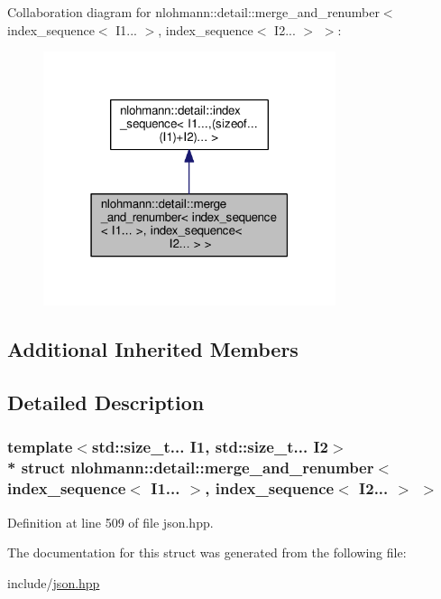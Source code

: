 Collaboration diagram for nlohmann\+:\+:detail\+:\+:merge\+\_\+and\+\_\+renumber$<$ index\+\_\+sequence$<$ I1... $>$, index\+\_\+sequence$<$ I2... $>$ $>$\+:\nopagebreak
\begin{figure}[H]
\begin{center}
\leavevmode
\includegraphics[width=243pt]{structnlohmann_1_1detail_1_1merge__and__renumber_3_01index__sequence_3_01_i1_8_8_8_01_4_00_01ind7f3f7d0d4c10bc1f158de4a327478fcd}
\end{center}
\end{figure}
\subsection*{Additional Inherited Members}


\subsection{Detailed Description}
\subsubsection*{template$<$std\+::size\+\_\+t... I1, std\+::size\+\_\+t... I2$>$\\*
struct nlohmann\+::detail\+::merge\+\_\+and\+\_\+renumber$<$ index\+\_\+sequence$<$ I1... $>$, index\+\_\+sequence$<$ I2... $>$ $>$}



Definition at line 509 of file json.\+hpp.



The documentation for this struct was generated from the following file\+:\begin{DoxyCompactItemize}
\item 
include/\hyperlink{json_8hpp}{json.\+hpp}\end{DoxyCompactItemize}
